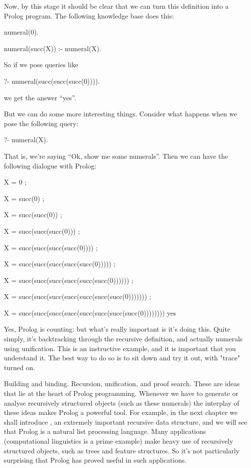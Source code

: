 Now, by this stage it should be clear that we can turn this
definition into a Prolog program.  The following knowledge base does
this:
\begin{LPNcodedisplay}
numeral(0).

numeral(succ(X)) :- numeral(X).
\end{LPNcodedisplay}
So if we pose queries like
\begin{LPNcodedisplay}
?- numeral(succ(succ(succ(0)))).
\end{LPNcodedisplay}
we get the answer ``yes''.

But we can do some more interesting things.  Consider what happens when
we pose the following query:
\begin{LPNcodedisplay}
?- numeral(X).
\end{LPNcodedisplay}
That is, we're saying ``Ok, show me some numerals''.  Then we can have
the following dialogue with Prolog:
\begin{LPNcodedisplay}
X = 0 ;

X = succ(0) ;

X = succ(succ(0)) ;

X = succ(succ(succ(0))) ;

X = succ(succ(succ(succ(0)))) ;

X = succ(succ(succ(succ(succ(0))))) ;

X = succ(succ(succ(succ(succ(succ(0)))))) ;

X = succ(succ(succ(succ(succ(succ(succ(0))))))) ;

X = succ(succ(succ(succ(succ(succ(succ(succ(0))))))))
yes
\end{LPNcodedisplay}


Yes, Prolog is counting: but what's really important is  it's
doing this. Quite simply, it's backtracking through the recursive
definition, and actually  numerals using unification. This
is an instructive example, and it is important that you understand
it. The best way to do so is to sit down and try it out, with
"trace" turned on.

Building and binding.  Recursion, unification, and proof search.  These
are ideas that lie at the heart of Prolog programming.  Whenever we
have to generate or analyse recursively structured objects (such as
these numerals) the interplay of these ideas makes Prolog a powerful
tool.  For example, in the next chapter we shall introduce
, an extremely important recursive data structure, and
we will see that Prolog is a natural list processing language.  Many
applications (computational linguistics is a prime example) make heavy
use of recursively structured objects, such as trees and feature
structures.  So it's not particularly surprising that Prolog has
proved useful in such applications.

